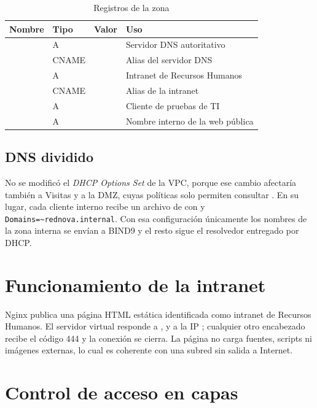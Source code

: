 \begin{table}[H]
\centering
\caption{Registros de la zona }
\begin{tabularx}{\textwidth}{p{3.2cm}C{1.6cm}p{4.2cm}Y}
\toprule
\textbf{Nombre} & \textbf{Tipo} & \textbf{Valor} & \textbf{Uso} \\
\midrule
{} & A &  & Servidor DNS autoritativo \\
 & CNAME &  & Alias del servidor DNS \\
 & A &  & Intranet de Recursos Humanos \\
 & CNAME &  & Alias de la intranet \\
 & A &  & Cliente de pruebas de TI \\
 & A &  & Nombre interno de la web pública \\
\bottomrule
\end{tabularx}
\end{table}

\subsection{DNS dividido}

No se modificó el \emph{DHCP Options Set} de la VPC, porque ese cambio afectaría también a
Visitas y a la DMZ, cuyas políticas solo permiten consultar . En su lugar, cada
cliente interno recibe un archivo de  con
 y \texttt{Domains=\textasciitilde{}rednova.internal}. Con esa
configuración únicamente los nombres de la zona interna se envían a BIND9 y el resto sigue el
resolvedor entregado por DHCP.

\section{Funcionamiento de la intranet}

Nginx publica una página HTML estática identificada como intranet de Recursos Humanos. El
servidor virtual responde a ,  y
a la IP ; cualquier otro encabezado  recibe el código 444 y la
conexión se cierra. La página no carga fuentes, scripts ni imágenes externas, lo cual es
coherente con una subred sin salida a Internet.

\section{Control de acceso en capas}

